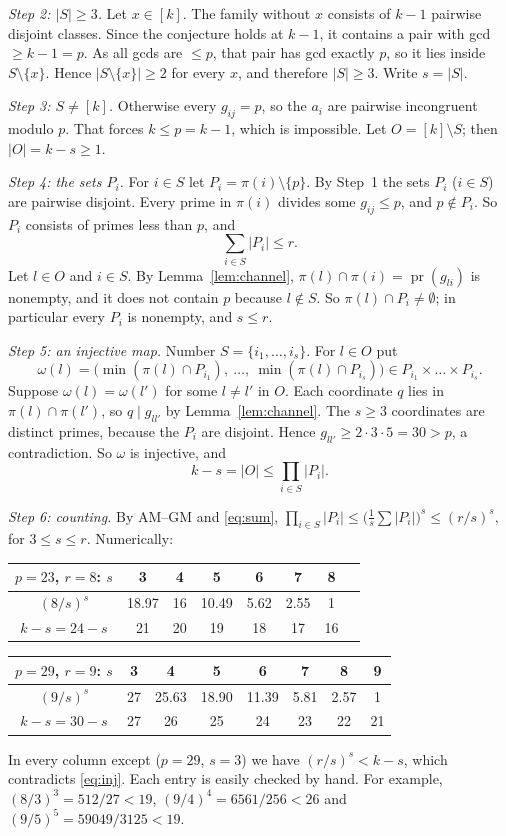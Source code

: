 \documentclass[11pt]{article}
\theoremstyle{definition}
\theoremstyle{remark}
\newcommand{\pr}{\operatorname{pr}}
\begin{document}
\emph{Step 2: $|S|\ge3$.} Let $x\in[k]$. The family without $x$ consists of $k-1$ pairwise
disjoint classes. Since the conjecture holds at $k-1$, it contains a pair with gcd $\ge k-1=p$.
As all gcds are $\le p$, that pair has gcd exactly $p$, so it lies inside $S\setminus\{x\}$. Hence
$|S\setminus\{x\}|\ge2$ for every $x$, and therefore $|S|\ge3$. Write $s=|S|$.

\emph{Step 3: $S\ne[k]$.} Otherwise every $g_{ij}=p$, so the $a_i$ are pairwise incongruent
modulo $p$. That forces $k\le p=k-1$, which is impossible. Let $O=[k]\setminus S$; then
$|O|=k-s\ge1$.

\emph{Step 4: the sets $P_i$.} For $i\in S$ let $P_i=\pi(i)\setminus\{p\}$. By Step~1 the sets
$P_i$ ($i\in S$) are pairwise disjoint. Every prime in $\pi(i)$ divides some $g_{ij}\le p$, and
$p\notin P_i$. So $P_i$ consists of primes less than $p$, and
\begin{equation}\label{eq:sum}
  \sum_{i\in S}|P_i|\le r .
\end{equation}
Let $l\in O$ and $i\in S$. By Lemma~\ref{lem:channel}, $\pi(l)\cap\pi(i)=\pr(g_{li})$ is nonempty,
and it does not contain $p$ because $l\notin S$. So $\pi(l)\cap P_i\ne\emptyset$; in particular every
$P_i$ is nonempty, and $s\le r$.

\emph{Step 5: an injective map.} Number $S=\{i_1,\dots,i_s\}$. For $l\in O$ put
\[
  \omega(l)=\bigl(\min(\pi(l)\cap P_{i_1}),\ \dots,\ \min(\pi(l)\cap P_{i_s})\bigr)\in P_{i_1}\times\dots\times P_{i_s}.
\]
Suppose $\omega(l)=\omega(l')$ for some $l\ne l'$ in $O$. Each coordinate $q$ lies in
$\pi(l)\cap\pi(l')$, so $q\mid g_{ll'}$ by Lemma~\ref{lem:channel}. The $s\ge3$ coordinates are
distinct primes, because the $P_i$ are disjoint. Hence $g_{ll'}\ge2\cdot3\cdot5=30>p$, a
contradiction. So $\omega$ is injective, and
\begin{equation}\label{eq:inj}
  k-s=|O|\le\prod_{i\in S}|P_i|.
\end{equation}

\emph{Step 6: counting.} By AM--GM and \eqref{eq:sum},
$\prod_{i\in S}|P_i|\le\bigl(\tfrac1s\sum|P_i|\bigr)^s\le(r/s)^s$, for $3\le s\le r$. Numerically:
\begin{center}
\begin{tabular}{c|cccccc|c}
$p=23$, $r=8$: $s$ & 3&4&5&6&7&8&\\ \hline
$(8/s)^s$ & 18.97&16&10.49&5.62&2.55&1&\\
$k-s=24-s$ & 21&20&19&18&17&16&
\end{tabular}

\medskip
\begin{tabular}{c|ccccccc}
$p=29$, $r=9$: $s$ & 3&4&5&6&7&8&9\\ \hline
$(9/s)^s$ & 27&25.63&18.90&11.39&5.81&2.57&1\\
$k-s=30-s$ & 27&26&25&24&23&22&21
\end{tabular}
\end{center}
In every column except ($p=29$, $s=3$) we have $(r/s)^s<k-s$, which contradicts \eqref{eq:inj}.
Each entry is easily checked by hand. For example, $(8/3)^3=512/27<19$,
$(9/4)^4=6561/256<26$ and $(9/5)^5=59049/3125<19$.
\end{document}
